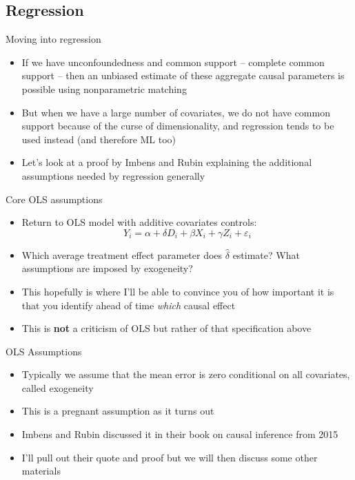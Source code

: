 \documentclass{beamer}
\begin{document}
\subsection{Regression}

\begin{frame}{Moving into regression}

\begin{itemize}

\item If we have unconfoundedness and common support -- complete common support -- then an unbiased estimate of these aggregate causal parameters is possible using nonparametric matching
\item But when we have a large number of covariates, we do not have common support because of the curse of dimensionality, and regression tends to be used instead (and therefore ML too)
\item Let's look at a proof by Imbens and Rubin explaining the additional assumptions needed by regression generally

\end{itemize}

\end{frame}

\begin{frame}{Core OLS assumptions}

\begin{itemize}
\item Return to OLS model with additive covariates  controls: $$Y_i = \alpha + \delta D_i + \beta X_i + \gamma Z_i + \varepsilon_i$$
\item Which average treatment effect parameter does $\widehat{\delta}$ estimate?  What assumptions are imposed by exogeneity?
\item This hopefully is where I'll be able to convince you of how important it is that you identify ahead of time \emph{which} causal effect
\item This is \textbf{not} a criticism of OLS but rather of that specification above
\end{itemize}

\end{frame}

\begin{frame}{OLS Assumptions}

\begin{itemize}

\item Typically we assume that the mean error is zero conditional on all covariates, called exogeneity
\item This is a pregnant assumption as it turns out
\item Imbens and Rubin discussed it in their book on causal inference from 2015
\item I'll pull out their quote and proof but we will then discuss some other materials

\end{itemize}

\end{frame}
\end{document}
